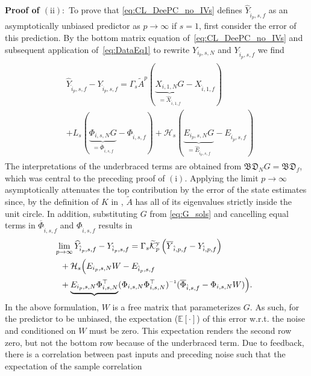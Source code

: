 \noindent\textbf{Proof of $\mathrm{(ii)}:$} To prove that \eqref{eq:CL_DeePC_no_IVs} defines $\widehat{Y}_{\hat{i}_p,s,f}$ as an asymptotically unbiased predictor as $p\rightarrow\infty$ if $s=1$, first consider the error of this prediction. By the bottom matrix equation of~\eqref{eq:CL_DeePC_no_IVs} and subsequent application of~\eqref{eq:DataEq1} to rewrite $Y_{i_p,s,N}$ and $Y_{\hat{i}_p,s,f}$ we find
\begin{align}%
    \begin{split}
        &\!\!\!\widehat{Y}_{\hat{i}_p,s,f}-Y_{\hat{i}_p,s,f} = \Gamma_s \tilde{A}^p (\underbrace{X_{i,1,N}G}_{=\widehat{X}_{\hat{i},1,f}}-X_{\hat{i},1,f}) \\
        &+L_s(\underbrace{\Phi_{i,s,N}G}_{=\overline{\Phi}_{\hat{i},s,f}}-\Phi_{\hat{i},s,f}) +\mathcal{H}_s (\underbrace{E_{i_p,s,N}G}_{=\widehat{E}_{\hat{i}_p,s,f}}-E_{\hat{i}_p,s,f})
    \end{split}
\end{align}
The interpretations of the underbraced terms are obtained from $\mathfrak{BD}_N G=\mathfrak{BD}_f$, which was central to the preceding proof of $\mathrm{(i)}$. Applying the limit $p\rightarrow\infty$ asymptotically attenuates the top contribution by the error of the state estimates since, by the definition of $K$ in , $\tilde{A}$ has all of its eigenvalues strictly inside the unit circle. In addition, substituting $G$ from \eqref{eq:G_sols} and cancelling equal terms in $\overline{\Phi}_{\hat{i},s,f}$ and $\Phi_{\hat{i},s,f}$ results in
\begin{alignat}{2}
        &\!\!\!\!\lim_{p\rightarrow\infty} \widehat{Y}_{\hat{i}_p,s,f}-Y_{\hat{i}_p,s,f} = \Gamma_s\tKp{y}\left(\overline{Y}_{\hat{i},p,f}-Y_{\hat{i},p,f}\right)\notag\\
        &+\mathcal{H}_s\Big(E_{i_p,s,N} W-E_{\hat{i}_p,s,f}\\%
        &+\underbrace{E_{i_p,s,N}\Phi_{i,s,N}^\top}(\Phi_{i,s,N}\Phi_{i,s,N}^\top)\inv(\overline{\Phi}_{\hat{i},s,f}-\Phi_{i,s,N}W)\Big)\notag.
\end{alignat}%
In the above formulation, $W$ is a free matrix that parameterizes $G$. As such, for the predictor to be unbiased, the expectation ($\mathbb{E}[\cdot]$) of this error w.r.t. the noise and conditioned on $W$ must be zero.  This expectation renders the second row zero, but not the bottom row because of the underbraced term. Due to feedback, there is a correlation between past inputs and preceding noise such that the expectation of the sample correlation
